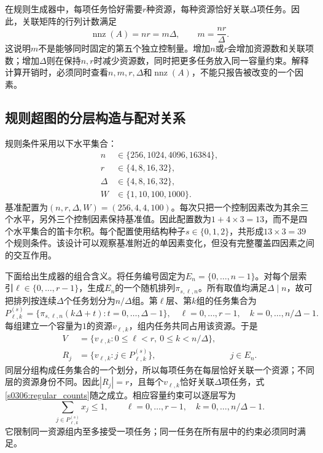 在规则生成器中，每项任务恰好需要$r$种资源，每种资源恰好关联$\Delta$项任务。因此，关联矩阵的行列计数满足
\begin{equation}
 \operatorname{nnz}(A)=nr=m\Delta,
 \qquad m=\frac{nr}{\Delta}.
 \label{s0306:regular_counts}
\end{equation}
这说明$m$不是能够同时固定的第五个独立控制量。增加$n$或$r$会增加资源数和关联项数；增加$\Delta$则在保持$n,r$时减少资源数，同时把更多任务放入同一容量约束。解释计算开销时，必须同时查看$n,m,r,\Delta$和$\operatorname{nnz}(A)$，不能只报告被改变的一个因素。

\subsection{规则超图的分层构造与配对关系}

规则条件采用以下水平集合：
\begin{equation}
 \begin{aligned}
 n&\in\{256,1024,4096,16384\},\\
 r&\in\{4,8,16,32\},\\
 \Delta&\in\{4,8,16,32\},\\
 W&\in\{1,10,100,1000\}.
 \end{aligned}
 \label{s0306:levels}
\end{equation}
基准配置为$(n,r,\Delta,W)=(256,4,4,100)$。每次只把一个控制因素改为其余三个水平，另外三个控制因素保持基准值。因此配置数为$1+4\times3=13$，而不是四个水平集合的笛卡尔积。每个配置使用结构种子$s\in\{0,1,2\}$，共形成$13\times3=39$个规则条件。该设计可以观察基准附近的单因素变化，但没有完整覆盖四因素之间的交互作用。

下面给出生成器的组合含义。将任务编号固定为$E_n=\{0,\ldots,n-1\}$。对每个层索引$\ell\in\{0,\ldots,r-1\}$，生成$E_n$的一个随机排列$\pi_{s,\ell,n}$。所有取值均满足$\Delta\mid n$，故可把排列按连续$\Delta$个任务划分为$n/\Delta$组。第$\ell$层、第$k$组的任务集合为
\begin{equation}
 P_{\ell,k}^{(s)}=
 \{\pi_{s,\ell,n}(k\Delta+t):t=0,\ldots,\Delta-1\},
 \quad
 \ell=0,\ldots,r-1,\quad k=0,\ldots,n/\Delta-1.
 \label{s0306:partition}
\end{equation}
每组建立一个容量为$1$的资源$v_{\ell,k}$，组内任务共同占用该资源。于是
\begin{align}
 V&=\{v_{\ell,k}:0\leq\ell<r,\ 0\leq k<n/\Delta\},
 \label{s0306:layer_resources}\\
 R_j&=\{v_{\ell,k}:j\in P_{\ell,k}^{(s)}\},
 &&j\in E_n.\label{s0306:layer_incidence}
\end{align}
同层分组构成任务集合的一个划分，所以每项任务在每层恰好关联一个资源；不同层的资源身份不同。因此$|R_j|=r$，且每个$v_{\ell,k}$恰好关联$\Delta$项任务，式\eqref{s0306:regular_counts}随之成立。相应容量约束可以逐层写为
\begin{equation}
 \sum_{j\in P_{\ell,k}^{(s)}}x_j\leq1,
 \qquad
 \ell=0,\ldots,r-1,\quad k=0,\ldots,n/\Delta-1.
 \label{s0306:partition_constraints}
\end{equation}
它限制同一资源组内至多接受一项任务；同一任务在所有层中的约束必须同时满足。

